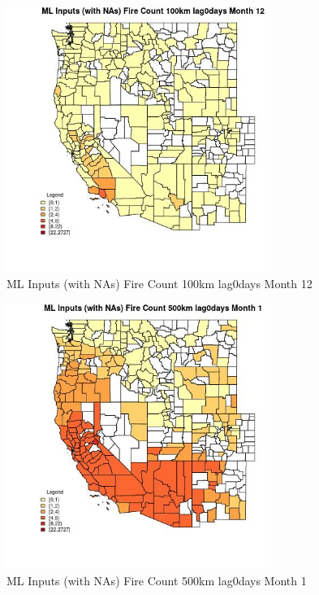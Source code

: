 \begin{figure} 
\centering  
\includegraphics[width=0.77\textwidth]{Code_Outputs/Report_ML_input_PM25_Step4_part_f_de_duplicated_aveswNAs_CountyFire_Count_100km_lag0daysmedianMonth12.jpg} 
\caption{\label{fig:Report_ML_input_PM25_Step4_part_f_de_duplicated_aveswNAsCountyFire_Count_100km_lag0daysmedianMonth12}ML Inputs (with NAs) Fire Count 100km lag0days Month 12} 
\end{figure} 
 

\begin{figure} 
\centering  
\includegraphics[width=0.77\textwidth]{Code_Outputs/Report_ML_input_PM25_Step4_part_f_de_duplicated_aveswNAs_CountyFire_Count_500km_lag0daysmedianMonth1.jpg} 
\caption{\label{fig:Report_ML_input_PM25_Step4_part_f_de_duplicated_aveswNAsCountyFire_Count_500km_lag0daysmedianMonth1}ML Inputs (with NAs) Fire Count 500km lag0days Month 1} 
\end{figure} 
 


